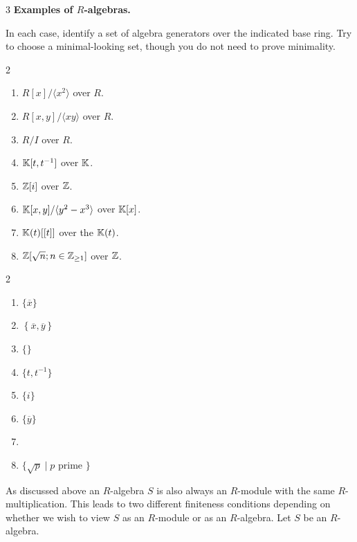 \documentclass[Notebook.tex]{subfiles}
\begin{document}
\newpage 

\begin{problem}{3}
    \textbf{Examples of $R$-algebras.} 
    
    In each case, identify a set of algebra generators over the indicated base ring. Try to choose a minimal-looking set, though you do not need to prove minimality.
    \begin{multicols}{2}
    \begin{enumerate}
        \item $R[x]/\langle x^2\rangle$ over $R$.
        \item $R[x,y]/\langle xy\rangle$ over $R$.
        \item $R/I$ over $R$.
        \item $\mathbb K[t,t^{-1}]$ over $\mathbb K$.
        \item $\mathbb Z[i]$ over $\mathbb Z$.
        \item $\mathbb K[x,y]/\langle y^2-x^3\rangle$ over $\mathbb K[x]$.
        \item $\mathbb K(t)[[t]]$ over the $\mathbb K(t)$.
        \item $\mathbb Z[\sqrt{n} ; n \in \mathbb Z_{\geq1}]$ over $\mathbb Z$. 
    \end{enumerate}
    \end{multicols}    
\end{problem}

\begin{solution}
    \bbni
    \begin{multicols}{2}
        \begin{enumerate}
            \item $\{\overline{x}\}$
            \item $\left\{\overline{x}, \overline{y} \right\}$
            \item $\{\}$
            \item $\{t, t^{-1}\}$
            \item $\{i\}$ 
            \item $\{\overline{y}\}$
            \item \todo{}
            \item $\{\sqrt{p} \mid p \text{ prime }\}$
    \end{enumerate}
    \end{multicols}
\end{solution}

\hrulefill

As discussed above an $R$-algebra $S$ is also always an $R$-module with the same $R$-multiplication. This leads to two different finiteness conditions depending on whether we wish to view $S$ as an $R$-module or as an $R$-algebra. Let $S$ be an $R$-algebra.
\end{document}

